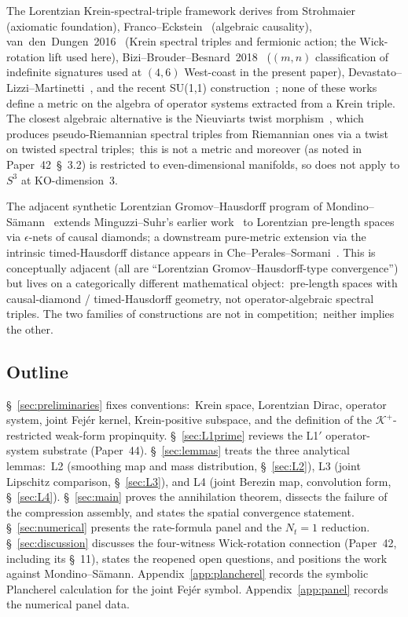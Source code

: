 \documentclass[11pt,a4paper]{article}
\theoremstyle{plain}
\theoremstyle{definition}
\newcommand{\Nt}{N_{t}}
\newcommand{\sthree}{S^{3}}
\newcommand{\Krein}{\mathcal{K}}
\newcommand{\Kplus}{\Krein^{+}}
\begin{document}
The Lorentzian Krein-spectral-triple framework derives from
Strohmaier~\cite{strohmaier2006} (axiomatic foundation),
Franco--Eckstein~\cite{franco_eckstein2014} (algebraic causality),
van~den~Dungen~2016~\cite{vandungen2016} (Krein spectral triples and
fermionic action; the Wick-rotation lift used here),
Bizi--Brouder--Besnard~2018~\cite{bizi_brouder_besnard2018}
($(m, n)$ classification of indefinite signatures used at $(4, 6)$
West-coast in the present paper),
Devastato--Lizzi--Martinetti~\cite{devastato_lizzi_martinetti2018},
and the recent SU(1,1) construction~\cite{de_groot2026_su11}; none of
these works define a metric on the algebra of operator systems
extracted from a Krein triple. The closest algebraic alternative is
the Nieuviarts twist morphism~\cite{nieuviarts2025a,nieuviarts2025b_proceedings},
which produces pseudo-Riemannian spectral triples from Riemannian ones
via a twist on twisted spectral triples;\ this is not a metric and
moreover (as noted in Paper~42~\S~3.2) is restricted to even-dimensional
manifolds, so does not apply to $\sthree$ at KO-dimension~3.

The adjacent synthetic Lorentzian Gromov--Hausdorff program of
Mondino--S\"amann~\cite{mondino_samann2025} extends
Minguzzi--Suhr's earlier work~\cite{minguzzi_suhr2024} to Lorentzian pre-length
spaces via $\epsilon$-nets of causal diamonds; a downstream pure-metric
extension via the intrinsic timed-Hausdorff distance appears
in Che--Perales--Sormani~\cite{che_perales_sormani2025}. This is
conceptually adjacent (all are ``Lorentzian Gromov--Hausdorff-type
convergence'') but lives on a categorically different mathematical
object:\ pre-length spaces with causal-diamond / timed-Hausdorff
geometry, not operator-algebraic spectral triples. The two families
of constructions are not in competition;\ neither implies the other.

\subsection{Outline}\label{sec:outline}

\S~\ref{sec:preliminaries} fixes conventions:\ Krein space, Lorentzian
Dirac, operator system, joint Fej\'er kernel, Krein-positive subspace,
and the definition of the $\Kplus$-restricted weak-form propinquity.
\S~\ref{sec:L1prime} reviews the L1$'$ operator-system substrate
(Paper~44). \S~\ref{sec:lemmas} treats the three analytical lemmas:\ L2
(smoothing map and mass distribution, \S~\ref{sec:L2}), L3 (joint
Lipschitz comparison, \S~\ref{sec:L3}), and L4 (joint Berezin map,
convolution form, \S~\ref{sec:L4}). \S~\ref{sec:main} proves the
annihilation theorem, dissects the failure of the compression
assembly, and states the spatial convergence statement.
\S~\ref{sec:numerical} presents the rate-formula panel and the
$\Nt = 1$ reduction. \S~\ref{sec:discussion} discusses the four-witness
Wick-rotation connection (Paper~42, including its \S~11), states the reopened open
questions, and positions the work against Mondino--S\"amann.
Appendix~\ref{app:plancherel} records the symbolic Plancherel
calculation for the joint Fej\'er symbol.
Appendix~\ref{app:panel} records the numerical panel data.
\end{document}
